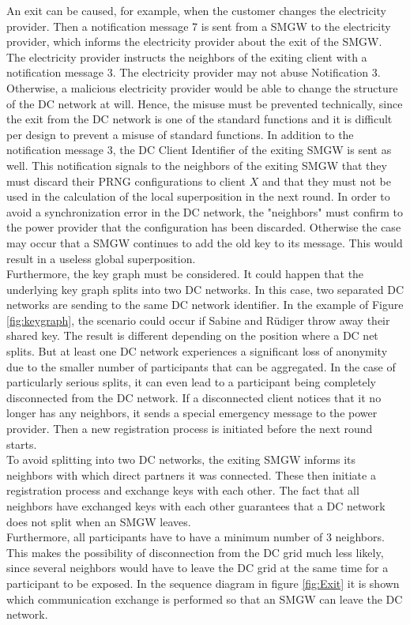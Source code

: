 An exit can be caused, for example, when the customer changes the electricity provider. Then a notification message 7 is sent from a SMGW to the electricity provider, which informs the electricity provider about the exit of the SMGW. The electricity provider instructs the neighbors of the exiting client with a notification message 3. The electricity provider may not abuse Notification 3. Otherwise, a malicious electricity provider would be able to change the structure of the DC network at will. Hence, the misuse must be prevented technically, since the exit from the DC network is one of the standard functions and it is difficult per design to prevent a misuse of standard functions. In addition to the notification message 3, the DC Client Identifier of the exiting SMGW is sent as well. This notification signals to the neighbors of the exiting SMGW that they must discard their PRNG configurations to client $X$ and that they must not be used in the calculation of the local superposition in the next round. In order to avoid a synchronization error in the DC network, the "neighbors" must confirm to the power provider that the configuration has been discarded. Otherwise the case may occur that a SMGW continues to add the old key to its message. This would result in a useless global superposition.\\ Furthermore, the key graph must be considered. It could happen that the underlying key graph splits into two DC networks. In this case, two separated DC networks are sending to the same DC network identifier. In the example of Figure \ref{fig:keygraph}, the scenario could occur if Sabine and Rüdiger throw away their shared key. The result is different depending on the position where a DC net splits. But at least one DC network experiences a significant loss of anonymity due to the smaller number of participants that can be aggregated. In the case of particularly serious splits, it can even lead to a participant being completely disconnected from the DC network. If a disconnected client notices that it no longer has any neighbors, it sends a special emergency message to the power provider. Then a new registration process is initiated before the next round starts.\\ To avoid splitting into two DC networks, the exiting SMGW informs its neighbors with which direct partners it was connected. These then initiate a registration process and exchange keys with each other. The fact that all neighbors have exchanged keys with each other guarantees that a DC network does not split when an SMGW leaves.\\ Furthermore, all participants have to have a minimum number of 3 neighbors. This makes the possibility of disconnection from the DC grid much less likely, since several neighbors would have to leave the DC grid at the same time for a participant to be exposed. In the sequence diagram in figure \ref{fig:Exit} it is shown which communication exchange is performed so that an SMGW can leave the DC network.
